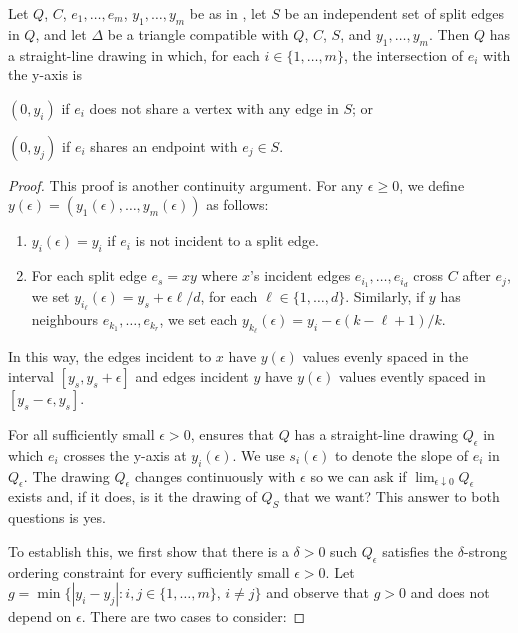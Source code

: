 \documentclass{patmorin}
\begin{document}
\begin{thm}
   Let $Q$, $C$, $e_1,\ldots,e_m$, $y_1,\ldots,y_m$ be as in
  , let $S$ be an independent set of split edges in $Q$,
  and let $\Delta$ be a triangle compatible with $Q$, $C$, $S$, and
  $y_1,\ldots,y_m$.  Then $Q$ has a straight-line drawing in which, for
  each $i\in\{1,\ldots,m\}$, the intersection of $e_i$ with the y-axis is
  \begin{compactenum}
     \item $(0,y_i)$ if $e_i$ does not share a vertex with any edge in $S$; or
     \item $(0,y_j)$ if $e_i$ shares an endpoint with $e_j\in S$.
  \end{compactenum}
\end{thm}

\begin{proof}
  This proof is another continuity argument. For any $\epsilon \ge 0$, we define
  $y(\epsilon)=(y_1(\epsilon),\ldots,y_m(\epsilon))$ as follows:
  \begin{enumerate}
    \item $y_i(\epsilon)= y_i$ if $e_i$ is not incident to a split edge.
    \item For each split edge $e_s=xy$ where $x$'s incident edges
  $e_{i_1},\ldots,e_{i_d}$ cross $C$ after $e_j$, we
  set $y_{i_\ell}(\epsilon)=y_s+\epsilon\ell/d$, for each
  $\ell\in\{1,\ldots,d\}$.  Similarly, if $y$ has neighbours
  $e_{k_1},\ldots,e_{k_r}$, we set each $y_{k_\ell}(\epsilon)=y_i -
  \epsilon(k-\ell+1)/k$. 
  \end{enumerate}
  In this way, the edges incident to $x$ have $y(\epsilon)$ values evenly
  spaced in the interval $[y_s,y_s+\epsilon]$ and edges incident $y$
  have $y(\epsilon)$ values evently spaced in $[y_s-\epsilon,y_s]$.

  For all sufficiently small $\epsilon >0$,  ensures
  that $Q$ has a straight-line drawing $Q_\epsilon$ in which $e_i$
  crosses the y-axis at $y_i(\epsilon)$. We use $s_i(\epsilon)$ to denote
  the slope of $e_i$
  in $Q_\epsilon$.
  The drawing $Q_\epsilon$ changes continuously with $\epsilon$ so we
  can ask if $\lim_{\epsilon\downarrow 0}Q_\epsilon$ exists and, if it
  does, is it the drawing of $Q_S$ that we want?  This answer to both
  questions is yes.

  To establish this, we first show that there is a $\delta>0$ such
  $Q_\epsilon$ satisfies the $\delta$-strong ordering constraint for
  every sufficiently small $\epsilon >0$.  Let $g=\min\{|y_i-y_j|:
  i,j\in\{1,\ldots,m\},\, i\neq j\}$ and observe that $g>0$ and does
  not depend on $\epsilon$.  There are two cases to consider:


\end{proof}
\end{document}
